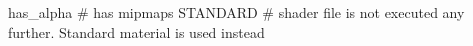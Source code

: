 has_alpha
# has mipmaps
STANDARD     # shader file is not executed any further. Standard material is used instead


